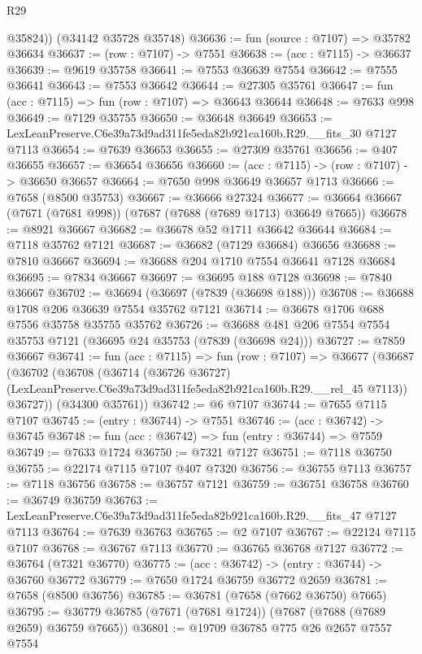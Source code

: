 \begin{lexlean}{R29}
\begin{coremodule}
        @35824))
    (@34142 @35728 @35748)
@36636 := fun (source : @7107) => @35782 @36634
@36637 := (row : @7107) -> @7551
@36638 := (acc : @7115) -> @36637
@36639 := @9619 @35758
@36641 := @7553 @36639 @7554
@36642 := @7555 @36641
@36643 := @7553 @36642
@36644 := @27305 @35761
@36647 := fun (acc : @7115) => fun (row : @7107) => @36643 @36644
@36648 := @7633 @998
@36649 := @7129 @35755
@36650 := @36648 @36649
@36653 := LexLeanPreserve.C6e39a73d9ad311fe5eda82b921ca160b.R29.__fits_30 @7127 @7113
@36654 := @7639 @36653
@36655 := @27309 @35761
@36656 := @407 @36655
@36657 := @36654 @36656
@36660 := (acc : @7115) -> (row : @7107) -> @36650 @36657
@36664 := @7650 @998 @36649 @36657 @1713
@36666 := @7658 (@8500 @35753)
@36667 := @36666 @27324
@36677 := @36664 @36667 (@7671 (@7681 @998)) (@7687 (@7688 (@7689 @1713) @36649 @7665))
@36678 := @8921 @36667
@36682 := @36678 @52 @1711 @36642 @36644
@36684 := @7118 @35762 @7121
@36687 := @36682 (@7129 @36684) @36656
@36688 := @7810 @36667
@36694 := @36688 @204 @1710 @7554 @36641 @7128 @36684
@36695 := @7834 @36667
@36697 := @36695 @188 @7128
@36698 := @7840 @36667
@36702 := @36694 (@36697 (@7839 (@36698 @188)))
@36708 := @36688 @1708 @206 @36639 @7554 @35762 @7121
@36714 := @36678 @1706 @688 @7556 @35758 @35755 @35762
@36726 := @36688 @481 @206 @7554 @7554 @35753 @7121 (@36695 @24 @35753 (@7839 (@36698 @24)))
@36727 := @7859 @36667
@36741 := fun (acc : @7115) =>
  fun (row : @7107) =>
  @36677
    (@36687
      (@36702
        (@36708
          (@36714
            (@36726 @36727)
            (LexLeanPreserve.C6e39a73d9ad311fe5eda82b921ca160b.R29.__rel_45 @7113))
          @36727))
      (@34300 @35761))
@36742 := @6 @7107
@36744 := @7655 @7115 @7107
@36745 := (entry : @36744) -> @7551
@36746 := (acc : @36742) -> @36745
@36748 := fun (acc : @36742) => fun (entry : @36744) => @7559
@36749 := @7633 @1724
@36750 := @7321 @7127
@36751 := @7118 @36750
@36755 := @22174 @7115 @7107 @407 @7320
@36756 := @36755 @7113
@36757 := @7118 @36756
@36758 := @36757 @7121
@36759 := @36751 @36758
@36760 := @36749 @36759
@36763 := LexLeanPreserve.C6e39a73d9ad311fe5eda82b921ca160b.R29.__fits_47 @7127 @7113
@36764 := @7639 @36763
@36765 := @2 @7107
@36767 := @22124 @7115 @7107
@36768 := @36767 @7113
@36770 := @36765 @36768 @7127
@36772 := @36764 (@7321 @36770)
@36775 := (acc : @36742) -> (entry : @36744) -> @36760 @36772
@36779 := @7650 @1724 @36759 @36772 @2659
@36781 := @7658 (@8500 @36756)
@36785 := @36781 (@7658 (@7662 @36750) @7665)
@36795 := @36779 @36785 (@7671 (@7681 @1724)) (@7687 (@7688 (@7689 @2659) @36759 @7665))
@36801 := @19709 @36785 @775 @26 @2657 @7557 @7554

\end{coremodule}
\end{lexlean}
